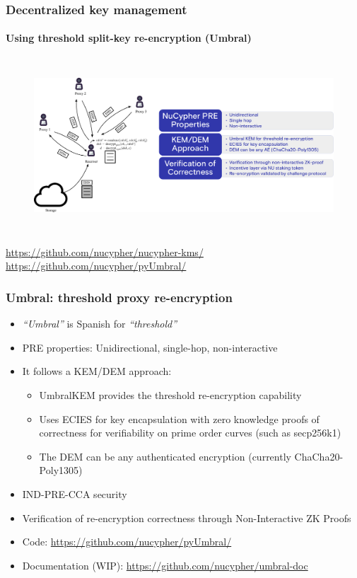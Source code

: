 \documentclass[xetex,mathsans,sans,aspectratio=169]{beamer}
\begin{document}
    \begin{frame}
        \frametitle{Decentralized key management}
        \framesubtitle{Using threshold split-key re-encryption (Umbral)}
        \begin{figure}
            \centering
            \includegraphics[height=6.5cm]{pdf/decrypt-umbral.pdf}
        \end{figure}
        \url{https://github.com/nucypher/nucypher-kms/}
        \url{https://github.com/nucypher/pyUmbral/}
    \end{frame}

    \begin{frame}
        \frametitle{Umbral: threshold proxy re-encryption}
        \begin{itemize}
        	\item \emph{``Umbral''} is Spanish for \emph{``threshold''}
            \item PRE properties: Unidirectional, single-hop, non-interactive
            \item It follows a KEM/DEM approach:
            	\begin{itemize}
					\item UmbralKEM provides the threshold re-encryption capability
                    \item Uses ECIES for key encapsulation with zero knowledge proofs of correctness for verifiability on prime order curves (such as secp256k1)
            		\item The DEM can be any authenticated encryption (currently ChaCha20-Poly1305)
        		\end{itemize}
			\item IND-PRE-CCA security
			\item Verification of re-encryption correctness through Non-Interactive ZK Proofs
			\item Code: \url{https://github.com/nucypher/pyUmbral/}
			\item Documentation (WIP): \url{https://github.com/nucypher/umbral-doc}
        \end{itemize}
    \end{frame}
\end{document}
